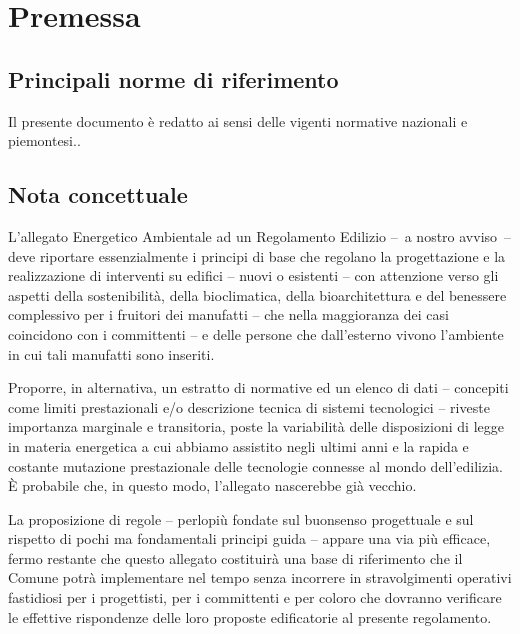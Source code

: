
\chapter{Premessa}
\label{chp:premessa}

\section{Principali norme di riferimento}
\label{sec:norme-riferimento-princ}

Il presente documento è redatto ai sensi delle vigenti normative nazionali e piemontesi..


\section{Nota concettuale}
\label{sec:nota-import}

L'allegato Energetico Ambientale ad un Regolamento Edilizio –~a nostro avviso~– deve riportare essenzialmente i principi di base che regolano la progettazione e la realizzazione di interventi su edifici – nuovi o esistenti – con attenzione verso gli aspetti della sostenibilità, della bioclimatica, della bioarchitettura e del benessere complessivo per i fruitori dei manufatti  – che nella maggioranza dei casi coincidono con i committenti – e delle persone che dall'esterno vivono l'ambiente in cui tali manufatti sono inseriti.

Proporre, in alternativa, un estratto di normative ed un elenco di dati – concepiti come limiti prestazionali e/o descrizione tecnica di sistemi tecnologici – riveste importanza marginale e transitoria, poste la variabilità delle disposizioni di legge in materia energetica a cui abbiamo assistito negli ultimi anni e la rapida e costante mutazione prestazionale delle tecnologie connesse al mondo dell'edilizia. È probabile che, in questo modo, l'allegato nascerebbe già vecchio. 

La proposizione di regole – perlopiù fondate sul buonsenso progettuale e sul rispetto di pochi ma fondamentali principi guida – appare una via più efficace,  fermo restante che questo allegato costituirà una base di riferimento che il Comune potrà implementare  nel tempo senza incorrere in stravolgimenti operativi fastidiosi per i progettisti, per i committenti e per coloro che dovranno verificare le effettive rispondenze delle loro proposte edificatorie al presente regolamento.




